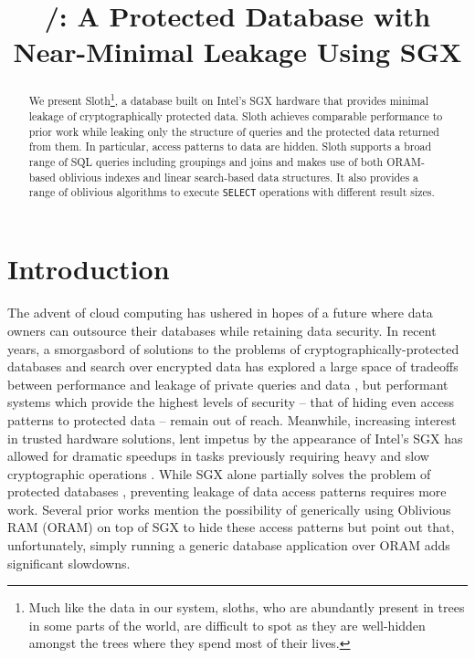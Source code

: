 \documentclass[USenglish,oneside,twocolumn]{article}
\author{}
\title{\textbf{\name/: A Protected Database with Near-Minimal Leakage Using SGX}}
\def\name/{Sloth}
\begin{document}
\maketitle
  \begin{abstract}
{We present \name/\footnote{Much like the data in our system, sloths, who are abundantly present in trees in some parts of the world, are difficult to spot as they are well-hidden amongst the trees where they spend most of their lives.}, a database built on Intel's SGX hardware that provides minimal leakage of cryptographically protected data. \name/ achieves comparable performance to prior work while leaking only the structure of queries and the protected data returned from them. In particular, access patterns to data are hidden. \name/ supports a broad range of SQL queries including groupings and joins and makes use of both ORAM-based oblivious indexes and linear search-based data structures. It also provides a range of oblivious algorithms to execute \texttt{SELECT} operations with different result sizes. 
}
\end{abstract} 

\section{Introduction}

The advent of cloud computing has ushered in hopes of a future where data owners can outsource their databases while retaining data security. In recent years, a smorgasbord of solutions to the problems of cryptographically-protected databases and search over encrypted data has explored a large space of tradeoffs between performance and leakage of private queries and data \cite{FVY+17}, but performant systems which provide the highest levels of security -- that of hiding even access patterns to protected data -- remain out of reach. Meanwhile, increasing interest in trusted hardware solutions, lent impetus by the appearance of Intel's SGX \cite{CD16} has allowed for dramatic speedups in tasks previously requiring heavy and slow cryptographic operations \cite{FVBG16, NFR+17}. While SGX alone partially solves the problem of protected databases \cite{FBB+17}, preventing leakage of data access patterns requires more work. Several prior works \cite{PBP16, DPP+16, FVY+17} mention the possibility of generically using Oblivious RAM (ORAM) on top of SGX to hide these access patterns but point out that, unfortunately, simply running a generic database application over ORAM adds significant slowdowns.
\end{document}
